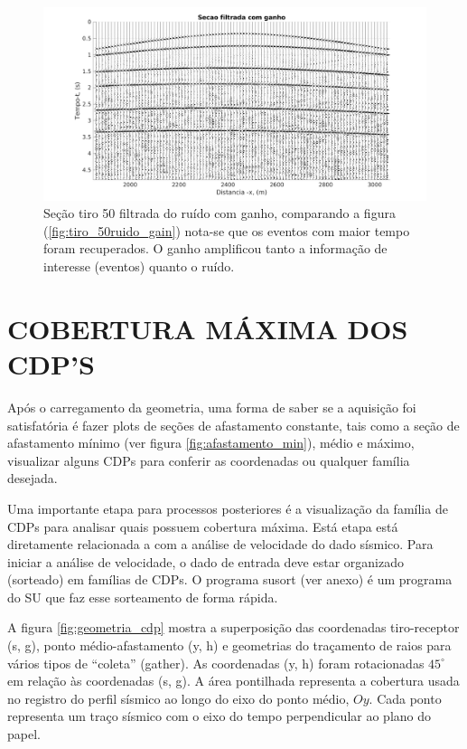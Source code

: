 \begin{landscape}
\begin{figure}[H]
\centering
\includegraphics[totalheight=14cm]{figuras/cap2/secao_filtrada_gain.pdf}
\caption{Seção tiro 50 filtrada do ruído com ganho, comparando a figura (\ref{fig:tiro_50ruido_gain}) nota-se que os eventos com maior tempo foram recuperados. O ganho amplificou tanto a informação de interesse (eventos) quanto o ruído.}
\label{fig:secao_filtrada_gain}
\end{figure}
\end{landscape}

\section{COBERTURA MÁXIMA DOS CDP'S}

Após o carregamento da geometria, uma forma de saber se a aquisição foi satisfatória é fazer plots de seções de afastamento constante, tais como a seção de afastamento mínimo (ver figura \ref{fig:afastamento_min}), médio e máximo, visualizar alguns CDPs para conferir as coordenadas ou qualquer família desejada.

Uma importante etapa para processos posteriores é a visualização da família de CDPs para analisar quais possuem cobertura máxima. Está etapa está diretamente relacionada a com a análise de velocidade do dado sísmico. Para iniciar a análise de velocidade, o dado de entrada deve estar organizado (sorteado) em famílias de CDPs. O programa susort (ver anexo) é um programa do SU que faz esse sorteamento de forma rápida. 

A figura \ref{fig:geometria_cdp} mostra a superposição das coordenadas tiro-receptor (s, g), ponto médio-afastamento (y, h) e geometrias do traçamento de raios para vários tipos de ``coleta'' (gather). As coordenadas (y, h) foram rotacionadas $45^{\circ}$ em relação às coordenadas (s, g). A área pontilhada representa a cobertura usada no registro do perfil sísmico ao longo do eixo do ponto médio, $Oy$.
Cada ponto representa um traço sísmico com o eixo do tempo perpendicular ao plano do papel.

